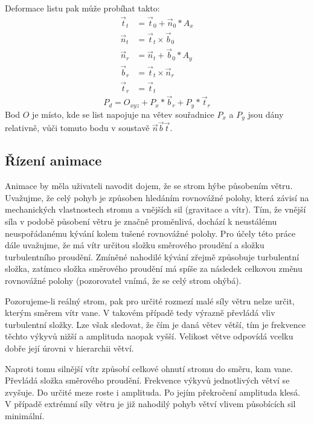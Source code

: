 Deformace listu pak může probíhat takto:
\begin{align*} 
\vec{t}_t &= \vec{t}_0 + \vec{n}_0*A_x\\
\vec{n}_t &= \vec{t}_t \times \vec{b}_0\\
\vec{n}_r &= \vec{n}_t + \vec{b}_0*A_y\\
\vec{b}_r &= \vec{t}_t \times \vec{n}_r\\
\vec{t}_r &= \vec{t}_t
\end{align*}
\newline
\begin{equation}
P_d = O_{xyz} + P_x*\vec{b}_r + P_y*\vec{t}_r
\end{equation}
Bod $O$ je místo, kde se list napojuje na větev souřadnice $P_x$ a $P_y$ jsou dány relativně, vůči tomuto bodu v soustavě $\vec{n}\vec{b}\vec{t}$.


\subsection{Řízení animace}

Animace by měla uživateli navodit dojem, že se strom hýbe působením větru. Uvažujme, že celý pohyb je způsoben hledáním rovnovážné polohy, která závisí na mechanických vlastnostech stromu a vnějších sil (gravitace a vítr). Tím, že vnější síla v podobě působení větru je značně proměnlivá, dochází k neustálému neuspořádanému kývání kolem tušené rovnovážné polohy. Pro účely této práce dále uvažujme, že má vítr určitou složku směrového proudění  a složku turbulentního proudění. Zmíněné nahodilé kývání zřejmě způsobuje turbulentní složka, zatímco složka směrového proudění má spíše za následek celkovou změnu rovnovážné polohy (pozorovatel vnímá, že se celý strom ohýbá). 

Pozorujeme-li reálný strom, pak pro určité rozmezí malé síly větru nelze určit, kterým směrem vítr vane. V takovém případě tedy výrazně převládá vliv turbulentní složky. Lze však sledovat, že čím je daná větev větší, tím je frekvence těchto výkyvů nižší a amplituda naopak vyšší. Velikost větve odpovídá vcelku dobře její úrovni v hierarchii větví. 

Naproti tomu silnější vítr způsobí celkové ohnutí stromu do směru, kam vane. Převládá složka směrového proudění. Frekvence výkyvů jednotlivých větví se zvyšuje. Do určité meze roste i amplituda. Po jejím překročení amplituda klesá. V případě extrémní síly větru je již nahodilý pohyb větví vlivem působících sil minimální.

